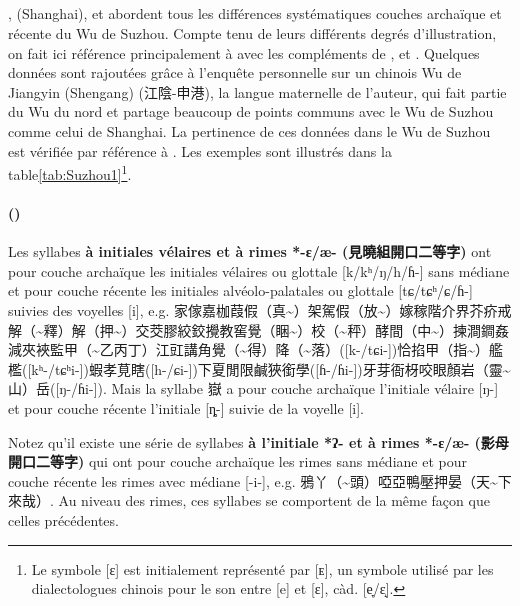 \documentclass{scrbook}
\newcounter{c}[subsubsection]
\newcommand{\stpc}[1]{\stepcounter{#1}}
\newcommand{\bolang}{\textasciitilde}
\newcommand{\difwenbai}{couches archaïque et récente\xspace}
\newcommand{\illustre}{Les exemples sont illustrés dans la table\xspace}
\newcommand{\termyyx}[1]{\textbf{#1}}
\begin{document}
\begin{sloppypar}
\subsection{\MakeCapital{\difwenbai}}
\textcite[18--26]{Ye1988suzhou}, \textcite[132--139]{Shen1988shanghai} (Shanghai), \textcite[35--37]{Wang1996suzhou} et \textcite{Ding2002suzhou} abordent tous les différences systématiques \difwenbai du Wu de Suzhou. Compte tenu de leurs différents degrés d'illustration, on fait ici référence principalement à \textcite{Ye1988suzhou} avec les compléments de \textcite[132--139]{Shen1988shanghai}, \textcite[35--37]{Wang1996suzhou} et \cite{Ding2002suzhou}. Quelques données sont rajoutées grâce à l'enquête personnelle sur un chinois Wu de Jiangyin (Shengang) (江陰-申港), la langue maternelle de l'auteur, qui fait partie du Wu du nord et partage beaucoup de points communs avec le Wu de Suzhou comme celui de Shanghai. La pertinence de ces données dans le Wu de Suzhou est vérifiée par référence à \textcite{Ye1993Suzhou}. \illustre \ref{tab:Suzhou1}\footnote{Le symbole [ɛ] est initialement représenté par [ᴇ], un symbole utilisé par les dialectologues chinois pour le son entre [e] et [ɛ], càd. [e̞/ɛ̝].}.

\stpc{c}\paragraph{()}
Les syllabes \termyyx{à initiales vélaires et à rimes *-ɛ/æ- (見曉組開口二等字)} ont pour couche archaïque les initiales vélaires ou glottale [k/kʰ/ŋ/h/ɦ-] sans médiane et pour couche récente les initiales alvéolo-palatales ou glottale [tɕ/tɕʰ/ɕ/ɦ-] suivies des voyelles [i], e.g. 家傢嘉枷葭假（真\bolang ）架駕假（放\bolang ）嫁稼階介界芥疥戒解（\bolang 釋）解（押\bolang ）交茭膠絞鉸攪教窖覺（睏\bolang ）校（\bolang 秤）酵間（中\bolang ）揀澗鐧姦減夾裌監甲（\bolang 乙丙丁）江豇講角覺（\bolang 得）降（\bolang 落）([k-/tɕi-])恰掐甲（指\bolang ）艦檻([kʰ-/tɕʰi-])蝦孝莧瞎([h-/ɕi-])下夏閒限鹹狹銜學([ɦ-/ɦi-])牙芽衙枒咬眼顏岩（靈\bolang 山）岳([ŋ-/ɦi-]). Mais la syllabe 嶽 a pour couche archaïque l'initiale vélaire [ŋ-] et pour couche récente l'initiale [ȵ-] suivie de la voyelle [i]. 

Notez qu'il existe une série de syllabes \termyyx{à l'initiale *ʔ- et à rimes *-ɛ/æ- (影母開口二等字)} qui ont pour couche archaïque les rimes sans médiane et pour couche récente les rimes avec médiane [-i-], e.g. 鴉丫（\bolang 頭）啞亞鴨壓押晏（天\bolang 下來哉）. Au niveau des rimes, ces syllabes se comportent de la même façon que celles précédentes. 


\end{sloppypar}
\end{document}
